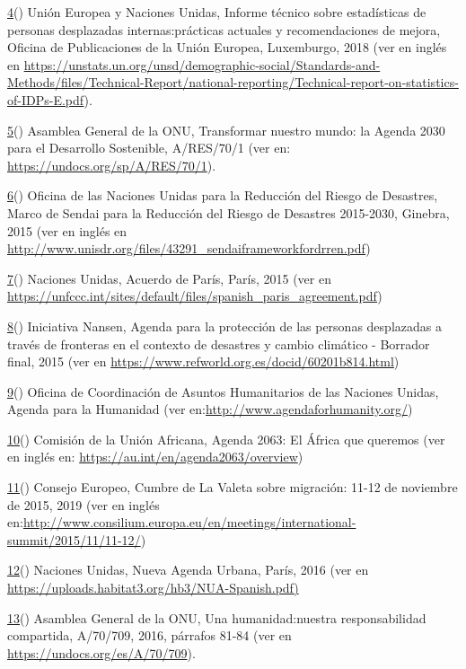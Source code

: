\documentclass[
]{book}
\begin{document}
\protect\hyperlink{sdfootnote4anc}{4}() Unión Europea y Naciones Unidas, Informe técnico sobre estadísticas de personas desplazadas internas:prácticas actuales y recomendaciones de mejora, Oficina de Publicaciones de la Unión Europea, Luxemburgo, 2018 (ver en inglés en \url{https://unstats.un.org/unsd/demographic-social/Standards-and-Methods/files/Technical-Report/national-reporting/Technical-report-on-statistics-of-IDPs-E.pdf}).

\protect\hyperlink{sdfootnote5anc}{5}() Asamblea General de la ONU, Transformar nuestro mundo: la Agenda 2030 para el Desarrollo Sostenible, A/RES/70/1 (ver en: \url{https://undocs.org/sp/A/RES/70/1}).

\protect\hyperlink{sdfootnote6anc}{6}() Oficina de las Naciones Unidas para la Reducción del Riesgo de Desastres, Marco de Sendai para la Reducción del Riesgo de Desastres 2015-2030, Ginebra, 2015 (ver en inglés en \url{http://www.unisdr.org/files/43291_sendaiframeworkfordrren.pdf})

\protect\hyperlink{sdfootnote7anc}{7}() Naciones Unidas, Acuerdo de París, París, 2015 (ver en \url{https://unfccc.int/sites/default/files/spanish_paris_agreement.pdf})

\protect\hyperlink{sdfootnote8anc}{8}() Iniciativa Nansen, Agenda para la protección de las personas desplazadas a través de fronteras en el contexto de desastres y cambio climático - Borrador final, 2015 (ver en \url{https://www.refworld.org.es/docid/60201b814.html})

\protect\hyperlink{sdfootnote9anc}{9}() Oficina de Coordinación de Asuntos Humanitarios de las Naciones Unidas, Agenda para la Humanidad (ver en:\url{http://www.agendaforhumanity.org/})

\protect\hyperlink{sdfootnote10anc}{10}() Comisión de la Unión Africana, Agenda 2063: El África que queremos (ver en inglés en: \url{https://au.int/en/agenda2063/overview})

\protect\hyperlink{sdfootnote11anc}{11}() Consejo Europeo, Cumbre de La Valeta sobre migración: 11-12 de noviembre de 2015, 2019 (ver en inglés en:\url{http://www.consilium.europa.eu/en/meetings/international-summit/2015/11/11-12/})

\protect\hyperlink{sdfootnote12anc}{12}() Naciones Unidas, Nueva Agenda Urbana, París, 2016 (ver en \href{https://uploads.habitat3.org/hb3/NUA-Spanish.pdf}{https://uploads.habitat3.org/hb3/NUA-Spanish.pdf)}

\protect\hyperlink{sdfootnote13anc}{13}() Asamblea General de la ONU, Una humanidad:nuestra responsabilidad compartida, A/70/709, 2016, párrafos 81-84 (ver en \url{https://undocs.org/es/A/70/709}).
\end{document}
